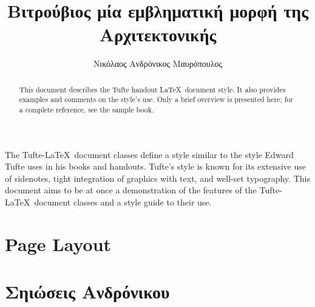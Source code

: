 \documentclass[%
              nobib,
              sfsidenotes,
              notoc,
              justified,
              a4paper,
              twoside,
              nohyper,
              ]%
              {tufte-handout}
\title{Βιτρούβιος μία εμβληματική μορφή της Αρχιτεκτονικής}
\author[Νικόλαος Ανδρόνικος Μαυρόπουλος]{Νικόλαος Ανδρόνικος Μαυρόπουλος}
\begin{document}
              
  \maketitle%
  
  
  \bigskip            
  \begin{abstract}
  \noindent This document describes the Tufte handout \LaTeX\ document style.
  It also provides examples and comments on the style's use.  Only a brief
  overview is presented here; for a complete reference, see the sample book.
  \end{abstract}
  \bigskip
              
  The Tufte-\LaTeX\ document classes \cite{dick-2007} define a style similar to the
  style Edward Tufte uses in his books and handouts.  Tufte's style is known
  for its extensive use of sidenotes, tight integration of graphics with
  text, and well-set typography.  This document aims to be at once a
  demonstration of the features of the Tufte-\LaTeX\ document classes
  and a style guide to their use.
              
  \section{Page Layout}\label{sec:page-layout}
  
  \section{Σηιώσεις Ανδρόνικου}
  
  
  
    \printbibliography[title={Βιβλιογραφικές αναφορές}]
              
              
\end{document}

